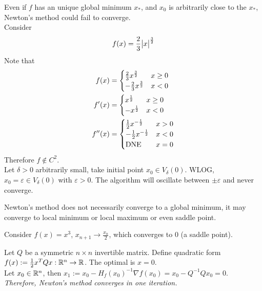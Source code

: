 \documentclass{article}
\begin{document}
	\begin{example}
		Even if $f$ has an unique global minimum $x_*$, and $x_0$ is arbitrarily close to the $x_*$, Newton's method could fail to converge. \\
		Consider
		\begin{align}
			f(x) = \frac{2}{3} \big \vert {x} \big \vert^{\frac{3}{2}}
		\end{align}
		Note that
		\begin{align}
			f(x)&=\begin{cases}{\frac{2}{3} x^{\frac{3}{2}}} & {x \geq 0} \\ {-\frac{2}{3} x^{\frac{3}{2}}} & {x<0}\end{cases} \\
			f'(x) &= \begin{cases}
				x^{\frac{1}{2}} & x \geq 0 \\
				- x^{\frac{1}{2}} & x < 0
			\end{cases} \\
			f''(x) &= \begin{cases}
				\frac{1}{2}x^{-\frac{1}{2}} & x > 0 \\
				- \frac{1}{2}x^{-\frac{1}{2}} & x < 0 \\
				\text{{DNE}} & x = 0
			\end{cases}
		\end{align}
		Therefore $f \notin C^2$. \\
		Let $\delta > 0$ arbitrarily small, take initial point $x_0 \in V_\delta(0)$. WLOG, $x_0 = \varepsilon \in V_\delta(0)$ with $\varepsilon > 0$. The algorithm will oscillate between $\pm \varepsilon$ and never converge.
	\end{example}
	
	\begin{remark}
		Newton's method does not necessarily converge to a global minimum, it may converge to local minimum or local maximum or even saddle point.
	\end{remark}
	
	\begin{example}
		Consider $f(x) = x^3$, $x_{n+1} \to \frac{x_n}{2}$, which converges to 0 (a saddle point).
	\end{example}
	
	\begin{example}
		Let $Q$ be a symmetric $n \times n$ invertible matrix. Define quadratic form $f(x) := \frac{1}{2}x^T Q x: \mathbb{R}^n \to \mathbb{R}$. The optimal is $x = 0$. \\
		Let $x_0 \in \mathbb{R}^n$, then $x_1 := x_0 - H_f(x_0)^{-1} \nabla f(x_0) = x_0 - Q^{-1}Qx_0 = 0$. \emph{Therefore, Newton's method converges in one iteration.} 
	\end{example}
\end{document}
